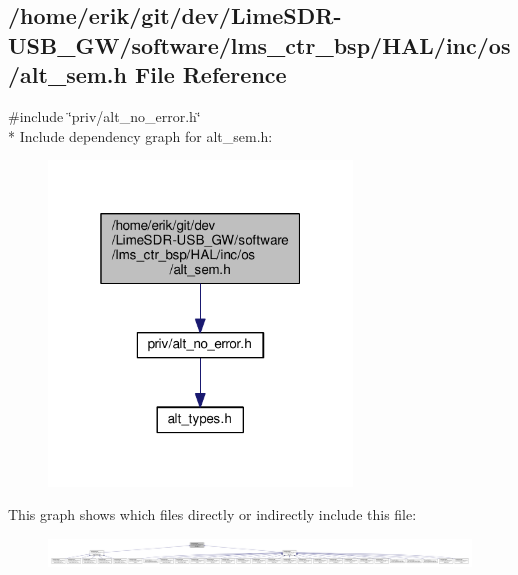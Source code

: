 \subsection{/home/erik/git/dev/\+Lime\+S\+D\+R-\/\+U\+S\+B\+\_\+\+G\+W/software/lms\+\_\+ctr\+\_\+bsp/\+H\+A\+L/inc/os/alt\+\_\+sem.h File Reference}
\label{alt__sem_8h}
{\ttfamily \#include \char`\"{}priv/alt\+\_\+no\+\_\+error.\+h\char`\"{}}\\*
Include dependency graph for alt\+\_\+sem.\+h\+:
\nopagebreak
\begin{figure}[H]
\begin{center}
\leavevmode
\includegraphics[width=229pt]{d8/d1e/alt__sem_8h__incl}
\end{center}
\end{figure}
This graph shows which files directly or indirectly include this file\+:
\nopagebreak
\begin{figure}[H]
\begin{center}
\leavevmode
\includegraphics[width=350pt]{d8/d86/alt__sem_8h__dep__incl}
\end{center}
\end{figure}
